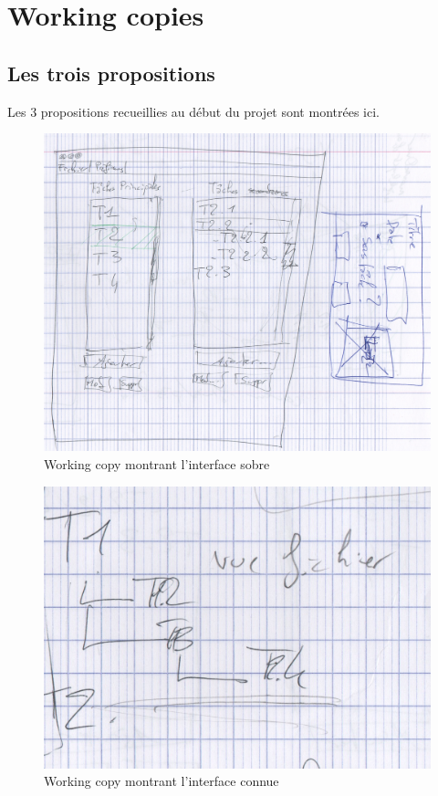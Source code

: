 \documentclass[11pt]{article}
\begin{document}
\section{Working copies}

\subsection{Les trois propositions}
\label{ann:props}

Les 3 propositions recueillies au début du projet sont montrées ici.

\begin{figure}[H]
  \centering
  \includegraphics[width=12cm]{img/sobre.jpg}
  \caption{Working copy montrant l'interface sobre}
  \label{fig:sobre}
\end{figure}

\begin{figure}[H]
  \centering
  \includegraphics[width=12cm]{img/connue.jpg}
  \caption{Working copy montrant l'interface connue}
  \label{fig:connue}
\end{figure}
\end{document}
